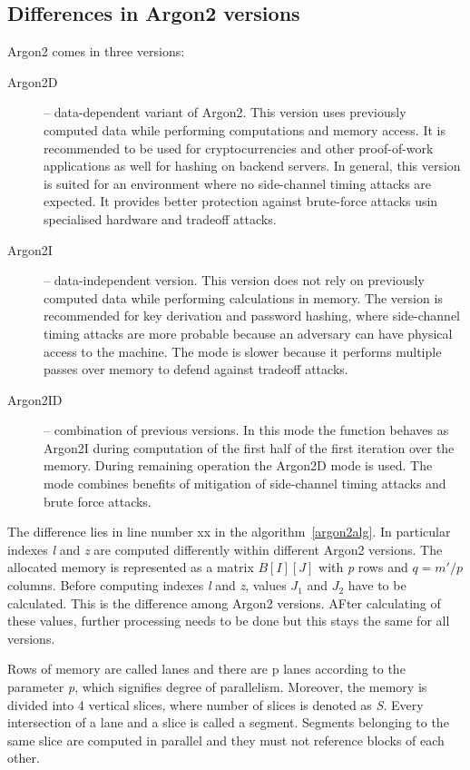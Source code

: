 \documentclass[nolof]{fithesis3}
\begin{document}
\subsection{Differences in Argon2 versions}
\label{argon2versions}
Argon2 comes in three versions:

\begin{description}
\item[Argon2D] -- data-dependent variant of Argon2. This version uses previously computed data while performing computations and memory access. It is recommended to be used for cryptocurrencies and other proof-of-work applications as well for hashing on backend servers. In general, this version is suited for an environment where no side-channel timing attacks are expected. It provides better protection against brute-force attacks usin specialised hardware and tradeoff attacks.

\item[Argon2I] -- data-independent version. This version does not rely on previously computed data while performing calculations in memory. The version is recommended for key derivation and password hashing, where side-channel timing attacks are more probable because an adversary can have physical access to the machine. The mode is slower because it performs multiple passes over memory to defend against tradeoff attacks.

\item[Argon2ID] -- combination of previous versions. In this mode the function behaves as Argon2I during computation of the first half of the first iteration over the memory. During remaining operation the Argon2D mode is used. The mode combines benefits of mitigation of side-channel timing attacks and brute force attacks.
\end{description}

The difference lies in line number xx in the algorithm~\ref{argon2alg}. In particular indexes \emph{l} and \emph{z} are computed differently within different Argon2 versions. The allocated memory is represented as a matrix \(B[I][J]\) with \emph{p} rows and \(q = m' / p\) columns. Before computing indexes \emph{l} and \emph{z}, values \(J_1\) and \(J_2\) have to be calculated. This is the difference among Argon2 versions. AFter calculating of these values, further processing needs to be done but this stays the same for all versions.

Rows of memory are called lanes and there are p lanes according to the parameter \emph{p}, which signifies degree of parallelism. Moreover, the memory is divided into 4 vertical slices, where number of slices is denoted as \emph{S}. Every intersection of a lane and a slice is called a segment. Segments belonging to the same slice are computed in parallel and they must not reference blocks of each other.
\end{document}
